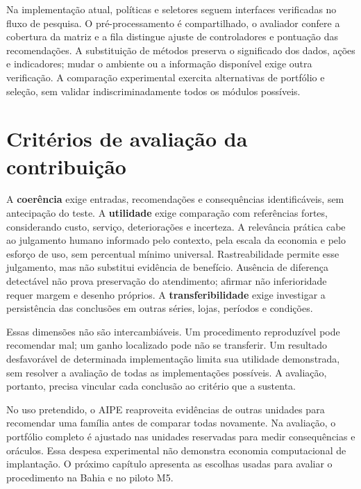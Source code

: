Na implementação atual, políticas e seletores seguem interfaces verificadas no fluxo de pesquisa. O pré-processamento é compartilhado, o avaliador confere a cobertura da matriz e a fila distingue ajuste de controladores e pontuação das recomendações. A substituição de métodos preserva o significado dos dados, ações e indicadores; mudar o ambiente ou a informação disponível exige outra verificação. A comparação experimental exercita alternativas de portfólio e seleção, sem validar indiscriminadamente todos os módulos possíveis.

\section{Critérios de avaliação da contribuição}
A \textbf{coerência} exige entradas, recomendações e consequências identificáveis, sem antecipação do teste. A \textbf{utilidade} exige comparação com referências fortes, considerando custo, serviço, deteriorações e incerteza. A relevância prática cabe ao julgamento humano informado pelo contexto, pela escala da economia e pelo esforço de uso, sem percentual mínimo universal. Rastreabilidade permite esse julgamento, mas não substitui evidência de benefício. Ausência de diferença detectável não prova preservação do atendimento; afirmar não inferioridade requer margem e desenho próprios. A \textbf{transferibilidade} exige investigar a persistência das conclusões em outras séries, lojas, períodos e condições.

Essas dimensões não são intercambiáveis. Um procedimento reproduzível pode recomendar mal; um ganho localizado pode não se transferir. Um resultado desfavorável de determinada implementação limita sua utilidade demonstrada, sem resolver a avaliação de todas as implementações possíveis. A avaliação, portanto, precisa vincular cada conclusão ao critério que a sustenta.

No uso pretendido, o AIPE reaproveita evidências de outras unidades para recomendar uma família antes de comparar todas novamente. Na avaliação, o portfólio completo é ajustado nas unidades reservadas para medir consequências e oráculos. Essa despesa experimental não demonstra economia computacional de implantação. O próximo capítulo apresenta as escolhas usadas para avaliar o procedimento na Bahia e no piloto M5.

